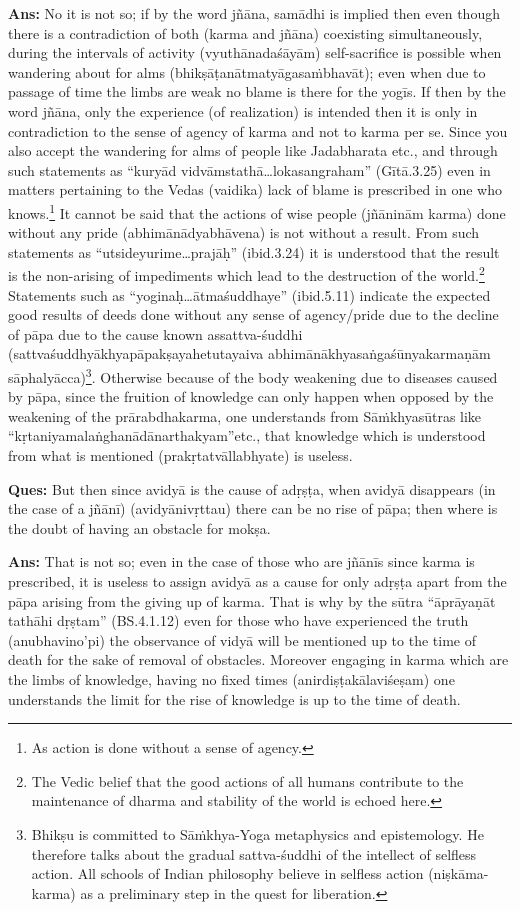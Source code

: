 \textbf{Ans:} No it is not so; if by the word jñāna, samādhi is implied then even though there is a contradiction of both (karma and jñāna) coexisting simultaneously, during the intervals of activity (vyuthānadaśāyām) self-sacrifice is possible when wandering about for alms (bhikṣāṭanātmatyāgasaṁbhavāt); even when due to passage of time the limbs are weak no blame is there for the yogīs. If then by the word jñāna, only the experience (of realization) is intended then it is only in contradiction to the sense of agency of karma and not to karma per se. Since you also accept the wandering for alms of people like Jadabharata etc., and through such statements as “kuryād vidvāmstathā…lokasangraham” (Gītā.3.25) even in matters pertaining to the Vedas (vaidika) lack of blame is prescribed in one who knows.\footnote{As action is done without a sense of agency.}  It cannot be said that the actions of wise people (jñāninām karma) done without any pride (abhimānādyabhāvena) is not without a result. From such statements as “utsideyurime…prajāḥ” (ibid.3.24) it is understood that the result is the non-arising of impediments which lead to the destruction of the world.\footnote{The Vedic belief that the good actions of all humans contribute to the maintenance of dharma and stability
of the world is echoed here.} Statements such as “yoginaḥ…ātmaśuddhaye” (ibid.5.11) indicate the expected good results of deeds done without any sense of agency/pride due to the decline of pāpa due to the cause known as\break sattva-śuddhi (sattvaśuddhyākhyapāpakṣayahetutayaiva abhimānā\-khyasaṅgaśūnyakarmaṇām sāphalyācca)\footnote{Bhikṣu is committed to Sāṁkhya-Yoga metaphysics and epistemology. He therefore talks about the gradual
sattva-śuddhi of the intellect of selfless action. All schools of Indian philosophy believe in selfless action
(niṣkāma-karma) as a preliminary step in the quest for liberation.}. Otherwise because of the body weakening due to diseases caused by pāpa, since the fruition of knowledge can only happen when opposed by the weakening of the prārabdhakarma, one understands from Sāṁkhyasūtras like “kṛtaniyamalaṅghanādānarthakyam”etc., that knowledge which is understood from what is mentioned (prakṛtatvāllabhyate) is useless.

\textbf{Ques:} But then since avidyā is the cause of adṛṣṭa, when avidyā disappears (in the case of a jñānī) (avidyānivṛttau) there can be no rise of pāpa; then where is the doubt of having an obstacle for mokṣa.

\textbf{Ans:} That is not so; even in the case of those who are jñānīs since karma is prescribed, it is useless to assign avidyā as a cause for only adṛṣṭa apart from the pāpa arising from the giving up of karma. That is why by the sūtra “āprāyaṇāt tathāhi dṛṣtam” (BS.4.1.12) even for those who have experienced the truth (anubhavino’pi) the observance of vidyā will be mentioned up to the time of death for the sake of removal of obstacles. Moreover engaging in karma which are the limbs of knowledge, having no fixed times (anirdiṣṭakālaviśeṣam) one understands the limit for the rise of knowledge is up to the time of death. 

